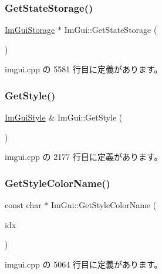 \subsubsection{\texorpdfstring{Get\+State\+Storage()}{GetStateStorage()}}
{\footnotesize\ttfamily \mbox{\hyperlink{struct_im_gui_storage}{Im\+Gui\+Storage}} $\ast$ Im\+Gui\+::\+Get\+State\+Storage (\begin{DoxyParamCaption}{ }\end{DoxyParamCaption})}



 imgui.\+cpp の 5581 行目に定義があります。

\mbox{\label{namespace_im_gui_abafef4bb3e3654efd96a47b2e22870a7}} 
\subsubsection{\texorpdfstring{Get\+Style()}{GetStyle()}}
{\footnotesize\ttfamily \mbox{\hyperlink{struct_im_gui_style}{Im\+Gui\+Style}} \& Im\+Gui\+::\+Get\+Style (\begin{DoxyParamCaption}{ }\end{DoxyParamCaption})}



 imgui.\+cpp の 2177 行目に定義があります。

\mbox{\label{namespace_im_gui_a265d7614c4c0b92ba6dd43946a3293e0}} 
\subsubsection{\texorpdfstring{Get\+Style\+Color\+Name()}{GetStyleColorName()}}
{\footnotesize\ttfamily const char $\ast$ Im\+Gui\+::\+Get\+Style\+Color\+Name (\begin{DoxyParamCaption}\item[{\mbox{\hyperlink{imgui_8h_a1b0467ec582e731ae6292fef726fb5fe}{Im\+Gui\+Col}}}]{idx }\end{DoxyParamCaption})}



 imgui.\+cpp の 5064 行目に定義があります。

\mbox{\label{namespace_im_gui_ad838e580972e2c4b3da2b0f60754b662}} 
